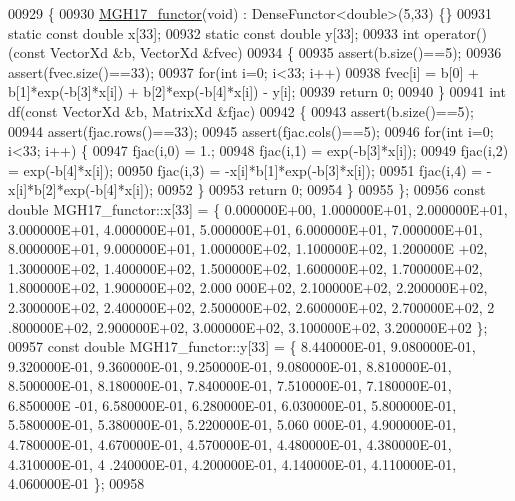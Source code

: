 \begin{DoxyCode}
00929 \{
00930     \hyperlink{struct_m_g_h17__functor}{MGH17\_functor}(\textcolor{keywordtype}{void}) : DenseFunctor<double>(5,33) \{\}
00931     \textcolor{keyword}{static} \textcolor{keyword}{const} \textcolor{keywordtype}{double} x[33];
00932     \textcolor{keyword}{static} \textcolor{keyword}{const} \textcolor{keywordtype}{double} y[33];
00933     \textcolor{keywordtype}{int} operator()(\textcolor{keyword}{const} VectorXd &b, VectorXd &fvec)
00934     \{
00935         assert(b.size()==5);
00936         assert(fvec.size()==33);
00937         \textcolor{keywordflow}{for}(\textcolor{keywordtype}{int} i=0; i<33; i++)
00938             fvec[i] =  b[0] + b[1]*exp(-b[3]*x[i]) +  b[2]*exp(-b[4]*x[i]) - y[i];
00939         \textcolor{keywordflow}{return} 0;
00940     \}
00941     \textcolor{keywordtype}{int} df(\textcolor{keyword}{const} VectorXd &b, MatrixXd &fjac)
00942     \{
00943         assert(b.size()==5);
00944         assert(fjac.rows()==33);
00945         assert(fjac.cols()==5);
00946         \textcolor{keywordflow}{for}(\textcolor{keywordtype}{int} i=0; i<33; i++) \{
00947             fjac(i,0) = 1.;
00948             fjac(i,1) = exp(-b[3]*x[i]);
00949             fjac(i,2) = exp(-b[4]*x[i]);
00950             fjac(i,3) = -x[i]*b[1]*exp(-b[3]*x[i]);
00951             fjac(i,4) = -x[i]*b[2]*exp(-b[4]*x[i]);
00952         \}
00953         \textcolor{keywordflow}{return} 0;
00954     \}
00955 \};
00956 \textcolor{keyword}{const} \textcolor{keywordtype}{double} MGH17\_functor::x[33] = \{ 0.000000E+00, 1.000000E+01, 2.000000E+01, 3.000000E+01, 4.000000E+01,
       5.000000E+01, 6.000000E+01, 7.000000E+01, 8.000000E+01, 9.000000E+01, 1.000000E+02, 1.100000E+02, 1.200000E
      +02, 1.300000E+02, 1.400000E+02, 1.500000E+02, 1.600000E+02, 1.700000E+02, 1.800000E+02, 1.900000E+02, 2.000
      000E+02, 2.100000E+02, 2.200000E+02, 2.300000E+02, 2.400000E+02, 2.500000E+02, 2.600000E+02, 2.700000E+02, 2
      .800000E+02, 2.900000E+02, 3.000000E+02, 3.100000E+02, 3.200000E+02 \};
00957 \textcolor{keyword}{const} \textcolor{keywordtype}{double} MGH17\_functor::y[33] = \{ 8.440000E-01, 9.080000E-01, 9.320000E-01, 9.360000E-01, 9.250000E-01,
       9.080000E-01, 8.810000E-01, 8.500000E-01, 8.180000E-01, 7.840000E-01, 7.510000E-01, 7.180000E-01, 6.850000E
      -01, 6.580000E-01, 6.280000E-01, 6.030000E-01, 5.800000E-01, 5.580000E-01, 5.380000E-01, 5.220000E-01, 5.060
      000E-01, 4.900000E-01, 4.780000E-01, 4.670000E-01, 4.570000E-01, 4.480000E-01, 4.380000E-01, 4.310000E-01, 4
      .240000E-01, 4.200000E-01, 4.140000E-01, 4.110000E-01, 4.060000E-01 \};
00958 

\end{DoxyCode}
